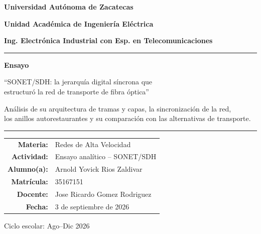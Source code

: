 \documentclass[12pt,a4paper]{article}
\begin{document}
\begin{titlepage}
    \centering
    \vspace*{1cm}
    {\Large\bfseries Universidad Autónoma de Zacatecas\par}
    \vspace{0.4cm}
    {\large\bfseries Unidad Académica de Ingeniería Eléctrica\par}
    {\large\bfseries Ing. Electrónica Industrial con Esp. en Telecomunicaciones\par}
    \vspace{1.5cm}
    \noindent\rule{\textwidth}{0.8pt}
    \vspace{1cm}
    {\huge\bfseries Ensayo\par}
    \vspace{0.7cm}
    {\Large ``SONET/SDH: la jerarquía digital síncrona que \\ estructuró la red de transporte de fibra óptica''\par}
    \vspace{0.6cm}
    {\normalsize Análisis de su arquitectura de tramas y capas, la sincronización de la red, \\ los anillos autorestaurantes y su comparación con las alternativas de transporte.\par}
    \vspace{1cm}
    \noindent\rule{\textwidth}{0.8pt}
    \vspace{1.8cm}

    \begin{tabular}{r l}
        \textbf{Materia:}    & Redes de Alta Velocidad \\[0.35cm]
        \textbf{Actividad:}  & Ensayo analítico -- SONET/SDH \\[0.35cm]
        \textbf{Alumno(a):}  & Arnold Yovick Rios Zaldivar \\[0.35cm]
        \textbf{Matrícula:}  & 35167151 \\[0.35cm]
        \textbf{Docente:}    & Jose Ricardo Gomez Rodriguez \\[0.35cm]
        \textbf{Fecha:}      & 3 de septiembre de 2026
    \end{tabular}

    \vfill
    Ciclo escolar: Ago--Dic 2026
    \vspace*{0.5cm}
\end{titlepage}
\setcounter{page}{1}

\end{document}
